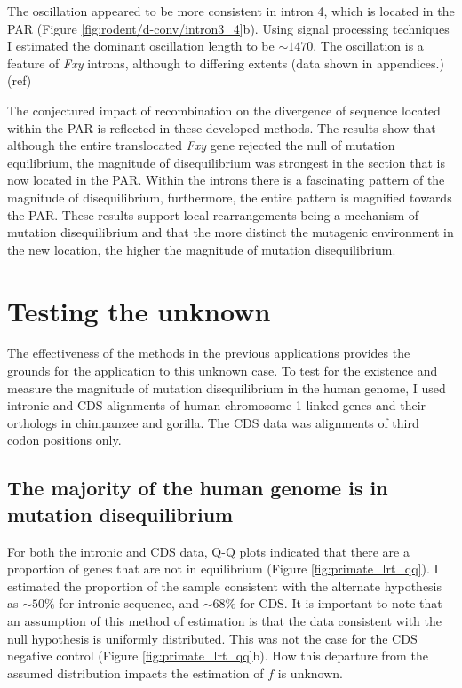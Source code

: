 The oscillation appeared to be more consistent in intron 4, which is located in the PAR (Figure \ref{fig:rodent/d-conv/intron3_4}b). Using signal processing techniques I estimated the dominant oscillation length to be $\sim1470$. The oscillation is a feature of \textit{Fxy} introns, although to differing extents (data shown in appendices.) (ref) 



The conjectured impact of recombination on the divergence of sequence located within the PAR is reflected in these developed methods. The results show that although the entire translocated \textit{Fxy} gene rejected the null of mutation equilibrium, the magnitude of disequilibrium was strongest in the section that is now located in the PAR. Within the introns there is a fascinating pattern of the magnitude of disequilibrium, furthermore, the entire pattern is magnified towards the PAR. These results support local rearrangements being a mechanism of mutation disequilibrium and that the more distinct the mutagenic environment in the new location, the higher the magnitude of mutation disequilibrium.

\section{Testing the unknown}

The effectiveness of the methods in the previous applications provides the grounds for the application to this unknown case. To test for the existence and measure the magnitude of mutation disequilibrium in the human genome, I used intronic and CDS alignments of human chromosome 1 linked genes and their orthologs in chimpanzee and gorilla. The CDS data was alignments of third codon positions only. 

\subsection{The majority of the human genome is in mutation disequilibrium}
\label{Human:TOE}
For both the intronic and CDS data, Q-Q plots indicated that there are a proportion of genes that are not in equilibrium (Figure \ref{fig:primate_lrt_qq}). I estimated the proportion of the sample consistent with the alternate hypothesis as $\sim50\%$ for intronic sequence, and $\sim68\%$ for CDS. It is important to note that an assumption of this method of estimation is that the data consistent with the null hypothesis is uniformly distributed. This was not the case for the CDS negative control (Figure \ref{fig:primate_lrt_qq}b). How this departure from the assumed distribution impacts the estimation of $f$ is unknown. 

